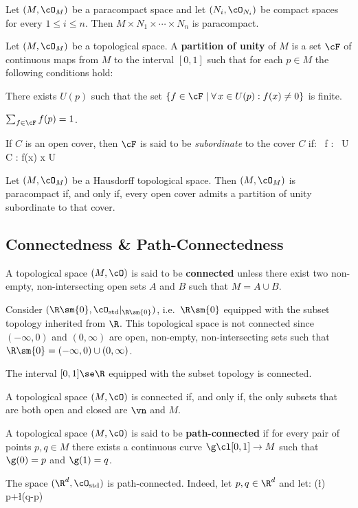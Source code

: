\bt[]
Let $(M,\cO_M)$ be a paracompact space and let $(N_i,\cO_{N_i})$ be compact spaces for every $1\leq i \leq n$. Then
$M\times N_1\times\cdots\times N_n$ is paracompact.
\et

Let $(M,\cO_M)$ be a topological space. A \textbf{partition of unity} of $M$ is a set $\cF$ of continuous maps from
$M$ to the interval $[0,1]$ such that for each $p\in M$ the following conditions hold:
\ben
\item[i)] There exists $U(p)$ such that the set $\{f \in \cF \mid \forall \, x \in U(p):f(x)\neq 0\}$ is finite.
\item[ii)] $\sum_{f\in \cF}f(p)=1$.
\een

If $C$ is an open cover, then $\cF$ is said to be \emph{subordinate} to the cover $C$ if:
\bse
\forall \, f \in \cF : \exists \, U \in C : f(x)  \imp x \in U
\ese
\ed

\bt[]
Let $(M,\cO_M)$ be a Hausdorff topological space. Then $(M,\cO_M)$ is paracompact if, and only if, every open cover
admits a partition of unity subordinate to that cover.
\et

\subsection{Connectedness \& Path-Connectedness}

A topological space $(M,\cO)$ is said to be \textbf{connected} unless there exist two non-empty, non-intersecting
open sets $A$ and $B$ such that $M=A\cup B$.
\ed

\be
Consider $(\R\sm \{0\},\cO_\mathrm{std}|_{\R\sm\{0\}})$, i.e.\ $\R\sm\{0\}$ equipped with the subset topology
inherited from $\R$. This topological space is not connected since $ (-\infty,0)$ and $(0,\infty)$ are open,
non-empty, non-intersecting sets such that $\R\sm\{0\}=(-\infty,0) \cup (0, \infty)$.
\ee

\bt[]
The interval $[0,1]\se\R$ equipped with the subset topology is connected.
\et

\bt[]
A topological space $(M,\cO)$ is connected if, and only if, the only subsets that are both open and closed are $\vn$
and $M$.
\et

A topological space $(M,\cO)$ is said to be \textbf{path-connected} if for every pair of points $p,q\in M$ there
exists a continuous curve $\g\cl[0,1]\to M$ such that $\g(0)=p$ and $\g(1)=q$.
\ed

\be
The space $(\R^d,\cO_\mathrm{std})$ is path-connected. Indeed, let $p,q\in\R^d$ and let:
\bse
\g(\l) \coloneqq p+\l(q-p)
\ese

